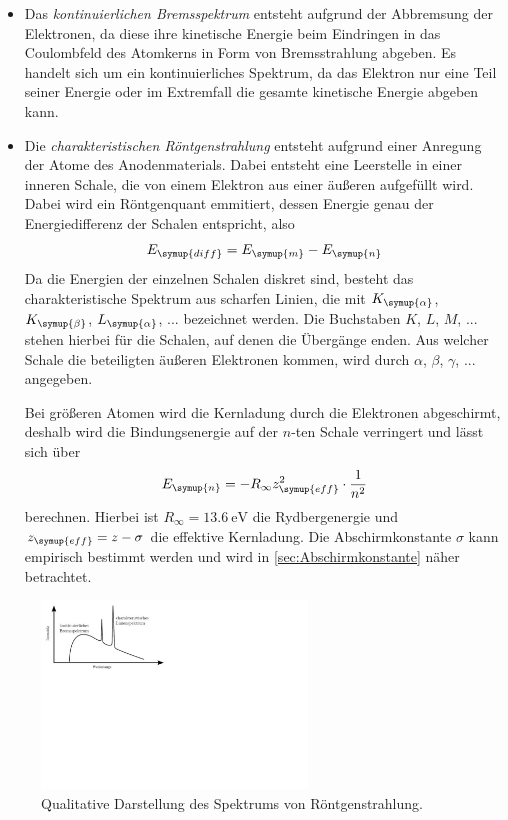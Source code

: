 \begin{itemize}
    \item Das \textit{kontinuierlichen Bremsspektrum} entsteht aufgrund der Abbremsung der Elektronen,
    da diese ihre kinetische Energie beim Eindringen in das Coulombfeld des Atomkerns in Form von Bremsstrahlung
    abgeben. Es handelt sich um ein kontinuierliches Spektrum, da das Elektron nur eine Teil seiner Energie oder
    im Extremfall die gesamte kinetische Energie abgeben kann.

    \item Die \textit{charakteristischen Röntgenstrahlung} entsteht aufgrund einer Anregung der Atome des Anodenmaterials.
    Dabei entsteht eine Leerstelle in einer inneren Schale, die von einem Elektron aus einer äußeren aufgefüllt wird.
    Dabei wird ein Röntgenquant emmitiert, dessen Energie genau der Energiedifferenz der Schalen entspricht, also
    \begin{equation*}
        E_{\symup{diff}}=E_{\symup{m}}-E_{\symup{n}}
    \end{equation*}
    Da die Energien der einzelnen Schalen diskret sind, besteht das charakteristische Spektrum aus scharfen Linien, die
    mit $K_{\symup{\alpha}}$, $K_{\symup{\beta}}$, $L_{\symup{\alpha}}$, ... bezeichnet werden. Die Buchstaben $K$, $L$, $M$, ...
    stehen hierbei für die Schalen, auf denen die Übergänge enden. Aus welcher Schale die beteiligten äußeren Elektronen
    kommen, wird durch $\alpha$, $\beta$, $\gamma$, ... angegeben.

    Bei größeren Atomen wird die Kernladung durch die Elektronen abgeschirmt, deshalb wird die Bindungsenergie auf der
    $n$-ten Schale verringert und lässt sich über
    \begin{equation}
        E_{\symup{n}}=-R_{\infty}z_{\symup{eff}}^{2}\cdot\frac{1}{n^2} \label{eq:Rydbergenergie}
    \end{equation}
    berechnen. Hierbei ist $R_{\infty}=\qty{13.6}{\electronvolt}$ die Rydbergenergie und $z_{\symup{eff}}=z-\sigma$
    die effektive Kernladung.
    Die Abschirmkonstante $\sigma$ kann empirisch bestimmt werden und wird in \ref{sec:Abschirmkonstante}
    näher betrachtet.  
\end{itemize}

\begin{figure}[H]
    \centering
    \includegraphics[height=5cm]{content/pics/bremsspektrum.pdf}
    \caption{Qualitative Darstellung des Spektrums von Röntgenstrahlung.\cite{Bremsspektrum}}
    \label{fig:Roentgen}
\end{figure}


